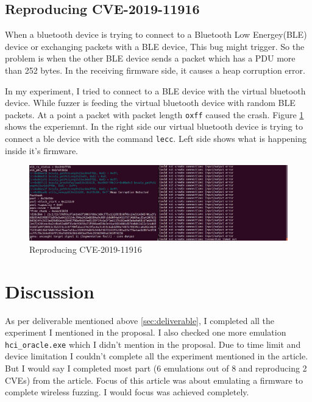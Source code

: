 \documentclass[letterpaper,11pt]{article}
\begin{document}
\subsection{Reproducing CVE-2019-11916}
When a bluetooth device is trying to connect to a Bluetooth Low Energey(BLE) device or exchanging packets with a BLE device, This bug might trigger. So the problem is when the other BLE device sends a packet which has a PDU more than 252 bytes. In the receiving firmware side, it causes a heap corruption error. 

In my experiment, I tried to connect to a BLE device with the virtual bluetooth device. While fuzzer is feeding the virtual bluetooth device with random BLE packets. At a point a packet with packet length \verb|oxff| caused the crash. Figure \ref{fig:ble_cve} shows the experiemnt. In the right side our virtual bluetooth device is trying to connect a ble device with the command \verb|lecc|. Left side shows what is happening inside it's firmware. 
\begin{figure}[!h]
    \centering
    \includegraphics[width=\textwidth]{images/Second-cve.png}      \caption{Reproducing CVE-2019-11916}
    \label{fig:ble_cve}
\end{figure}

\section{Discussion}
As per deliverable mentioned above \ref{sec:deliverable}, I completed all the experiment I mentioned in the proposal. I also checked one more emulation \verb|hci_oracle.exe| which I didn't mention in the proposal. Due to time limit and device limitation I couldn't complete all the experiment mentioned in the article. But I would say I completed most part (6 emulations out of 8 and reproducing 2 CVEs) from the article. Focus of this article was about emulating a firmware to complete wireless fuzzing. I would focus was achieved completely.


\printbibliography
\end{document}
